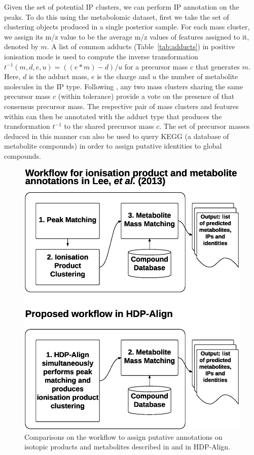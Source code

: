 Given the set of potential IP clusters, we can perform IP annotation on the peaks. To do this using the metabolomic dataset, first we take the set of clustering objects produced in a single posterior sample. For each mass cluster, we assign its m/z value to be the average m/z values of features assigned to it, denoted by $m$. A list of common adducts (Table~\ref{tab:adducts}) in positive ionisation mode is used to compute the inverse transformation $t^{-1}(m,d,e,u) = ((e*m)-d)/u$ for a precursor mass $c$ that generates $m$. Here, $d$ is the adduct mass, $e$ is the charge and $u$ the number of metabolite molecules in the IP type. Following \cite{Lee2013}, any two mass clusters sharing the same precursor mass $c$ (within tolerance) provide a vote on the presence of that consensus precursor mass. The respective pair of mass clusters and features within can then be annotated with the adduct type that produces the transformation $t^{-1}$ to the shared precursor mass $c$. The set of precursor masses deduced in this manner can also be used to query KEGG (a database of metabolite compounds) in order to assign putative identities to global compounds.

\begin{figure}[!htbp]
\centering\includegraphics[width=0.7\linewidth]{06-hdp/figures/figure_3.eps}
\centering\caption{Comparisons on the workflow to assign putative annotations on isotopic products and metabolites described in \cite{Lee2013} and in HDP-Align.\label{fig-workflow}}
\end{figure}

